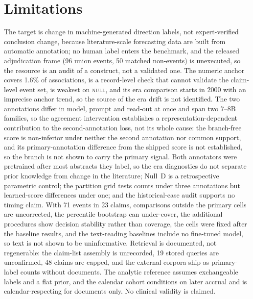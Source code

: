 \documentclass[11pt]{article}
\begin{document}
\section*{Limitations}
The target is change in machine-generated direction labels, not expert-verified conclusion change,
because literature-scale forecasting data are built from automatic annotation; no human label
enters the benchmark, and the released adjudication frame (96 union events, 50 matched non-events)
is unexecuted, so the resource is an audit of a construct, not a validated one. The numeric anchor
covers 1.6\% of associations, is a record-level check that cannot validate the claim-level event
set, is weakest on \textsc{null}, and its era comparison starts in 2000 with an imprecise anchor
trend, so the source of the era drift is not identified. The two annotations differ in model,
prompt and read-out at once and span two 7--8B families, so the agreement intervention establishes
a representation-dependent contribution to the second-annotation loss, not its whole cause: the
branch-free score is non-inferior under neither the second annotation nor common support, and its
primary-annotation difference from the shipped score is not established, so the branch is not
shown to carry the primary signal. Both annotators were pretrained after most abstracts they label,
so the era diagnostics do not separate prior knowledge from change in the literature; Null~D is a
retrospective parametric control; the partition grid tests counts under three annotations but
learned-score differences under one; and the historical-case audit supports no timing claim. With
71 events in 23 claims, comparisons outside the primary cells are uncorrected, the percentile
bootstrap can under-cover, the additional procedures show decision stability rather than coverage,
the cells were fixed after the baseline results, and the text-reading baselines include no
fine-tuned model, so text is not shown to be uninformative. Retrieval is documented, not
regenerable: the claim-list assembly is unrecorded, 19 stored queries are unconfirmed, 48 claims
are capped, and the external corpora ship as primary-label counts without documents. The analytic
reference assumes exchangeable labels and a flat prior, and the calendar cohort conditions on
later accrual and is calendar-respecting for documents only. No clinical validity is claimed.
\end{document}
